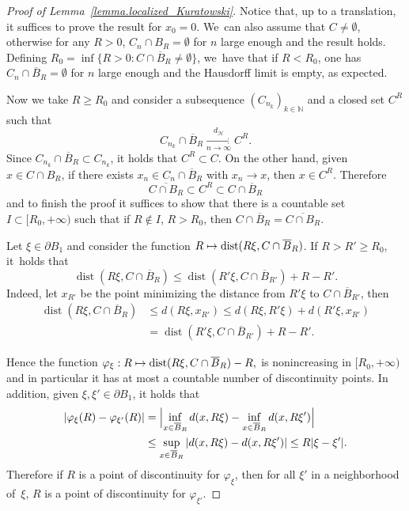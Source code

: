 \documentclass[10pt]{amsart}
\let\ts\textstyle
\newcommand\mto{\mathchoice{\longmapsto}{\mapsto}{\mapsto}{\mapsto}}
\theoremstyle{definition}
\DeclareMathOperator{\dist}{dist}
\newcommand{\distH}{d_{\mathcal{H}}}
\newcommand{\oB}{\overline{B}}
\begin{document}
\begin{proof}[Proof of Lemma~\ref{lemma.localized_Kuratowski}]
Notice that, up to a translation, it suffices to prove the result for $x_0 = 0$. We~can also assume that $C\neq\emptyset$, otherwise
for any $R>0$, $C_n\cap B_R=\emptyset$ for $n$ large enough and the result holds.
Defining $R_0=\inf\{R>0: C\cap \oB_R\neq\emptyset\}$, we~have that if $R<R_0$,
one has $C_n\cap \oB_{R}=\emptyset$ for $n$ large enough
and the Hausdorff limit is empty, as expected.

Now we take $R\ge R_0$ and consider a subsequence $\left(C_{n_k}\right)_{k \in \mathbb{N}}$ and a closed set $C^R$ such that
\[
C_{n_k}\cap \oB_R \xrightarrow[n \to \infty]{\ts\distH} C^R.
\]
Since $C_{n_k}\cap\oB_R\subset C_{n_k}$, it holds that $C^R\subset C$.
On the other hand, given $x\in C \cap B_R$, if there exists $x_n\in C_n \cap \oB_R$
with $x_n\to x$, then $x\in C^R$.
Therefore
\[
\overline{C\cap B_R}\subset C^R\subset C\cap\oB_R
\]
and to finish the proof it suffices to show that there is a countable set $I\subset [R_0,+\infty)$ such that
if $R\not\in I$, $R>R_0$, then $C\cap\oB_R =
\overline{C\cap B_R}$.

Let $\xi\in \partial B_1$ and consider the function
$R\mto \dist(R\xi,C\cap \oB_R)$. If $R>R'\ge R_0$, it~holds that
\[
\dist(R\xi,C\cap \oB_R)
\le \dist(R'\xi,C\cap \oB_{R'})+R-R'.
\]
Indeed, let $x_{R'}$ be the point minimizing the distance from $R'\xi$ to $C\cap \oB_{R'}$, then
\begin{align*}
\dist(R\xi, C\cap \oB_R)
&\le
d(R\xi, x_{R'})
\le
d(R\xi, R'\xi) + d(R'\xi, x_{R'}) \\
&=
\dist(R'\xi, C\cap \oB_{R'}) + R - R'.
\end{align*}

Hence the function
$
\varphi_\xi : R \mto \dist(R\xi,C\cap \oB_R)-R,
$
is nonincreasing in $[R_0,+\infty)$ and in particular it has at
most a countable number of discontinuity points. In addition, given $\xi,\xi'\in\partial B_1$, it holds that
\begin{align*}
\left|
\varphi_\xi(R) - \varphi_{\xi'}(R)
\right|
&=
\Bigl|
\inf_{x \in \oB_R} d(x, R\xi) - \inf_{x \in \oB_R} d(x, R\xi')
\Bigr|\\
&\le
\sup_{x \in \oB_R}
\left|
d(x, R\xi) - d(x, R\xi')
\right|
\le R|\xi - \xi'|.
\end{align*}
Therefore if $R$ is a point of discontinuity for $\varphi_\xi$, then
for all $\xi'$ in a neighborhood of~$\xi$, $R$ is a point
of discontinuity for $\varphi_{\xi'}$.


\end{proof}
\end{document}

